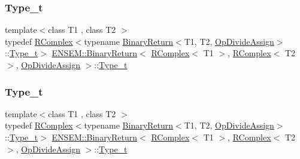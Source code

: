 \subsubsection{\texorpdfstring{Type\_t}{Type\_t}\hspace{0.1cm}{\footnotesize\ttfamily [1/2]}}
{\footnotesize\ttfamily template$<$class T1 , class T2 $>$ \\
typedef \mbox{\hyperlink{classENSEM_1_1RComplex}{R\+Complex}}$<$typename \mbox{\hyperlink{structENSEM_1_1BinaryReturn}{Binary\+Return}}$<$T1, T2, \mbox{\hyperlink{structENSEM_1_1OpDivideAssign}{Op\+Divide\+Assign}}$>$\+::\mbox{\hyperlink{structENSEM_1_1BinaryReturn_3_01RComplex_3_01T1_01_4_00_01RComplex_3_01T2_01_4_00_01OpDivideAssign_01_4_af46687e10b8bd51c6624cbfdfd75e9ec}{Type\+\_\+t}}$>$ \mbox{\hyperlink{structENSEM_1_1BinaryReturn}{E\+N\+S\+E\+M\+::\+Binary\+Return}}$<$ \mbox{\hyperlink{classENSEM_1_1RComplex}{R\+Complex}}$<$ T1 $>$, \mbox{\hyperlink{classENSEM_1_1RComplex}{R\+Complex}}$<$ T2 $>$, \mbox{\hyperlink{structENSEM_1_1OpDivideAssign}{Op\+Divide\+Assign}} $>$\+::\mbox{\hyperlink{structENSEM_1_1BinaryReturn_3_01RComplex_3_01T1_01_4_00_01RComplex_3_01T2_01_4_00_01OpDivideAssign_01_4_af46687e10b8bd51c6624cbfdfd75e9ec}{Type\+\_\+t}}}

\mbox{\label{structENSEM_1_1BinaryReturn_3_01RComplex_3_01T1_01_4_00_01RComplex_3_01T2_01_4_00_01OpDivideAssign_01_4_af46687e10b8bd51c6624cbfdfd75e9ec}} 
\subsubsection{\texorpdfstring{Type\_t}{Type\_t}\hspace{0.1cm}{\footnotesize\ttfamily [2/2]}}
{\footnotesize\ttfamily template$<$class T1 , class T2 $>$ \\
typedef \mbox{\hyperlink{classENSEM_1_1RComplex}{R\+Complex}}$<$typename \mbox{\hyperlink{structENSEM_1_1BinaryReturn}{Binary\+Return}}$<$T1, T2, \mbox{\hyperlink{structENSEM_1_1OpDivideAssign}{Op\+Divide\+Assign}}$>$\+::\mbox{\hyperlink{structENSEM_1_1BinaryReturn_3_01RComplex_3_01T1_01_4_00_01RComplex_3_01T2_01_4_00_01OpDivideAssign_01_4_af46687e10b8bd51c6624cbfdfd75e9ec}{Type\+\_\+t}}$>$ \mbox{\hyperlink{structENSEM_1_1BinaryReturn}{E\+N\+S\+E\+M\+::\+Binary\+Return}}$<$ \mbox{\hyperlink{classENSEM_1_1RComplex}{R\+Complex}}$<$ T1 $>$, \mbox{\hyperlink{classENSEM_1_1RComplex}{R\+Complex}}$<$ T2 $>$, \mbox{\hyperlink{structENSEM_1_1OpDivideAssign}{Op\+Divide\+Assign}} $>$\+::\mbox{\hyperlink{structENSEM_1_1BinaryReturn_3_01RComplex_3_01T1_01_4_00_01RComplex_3_01T2_01_4_00_01OpDivideAssign_01_4_af46687e10b8bd51c6624cbfdfd75e9ec}{Type\+\_\+t}}}



